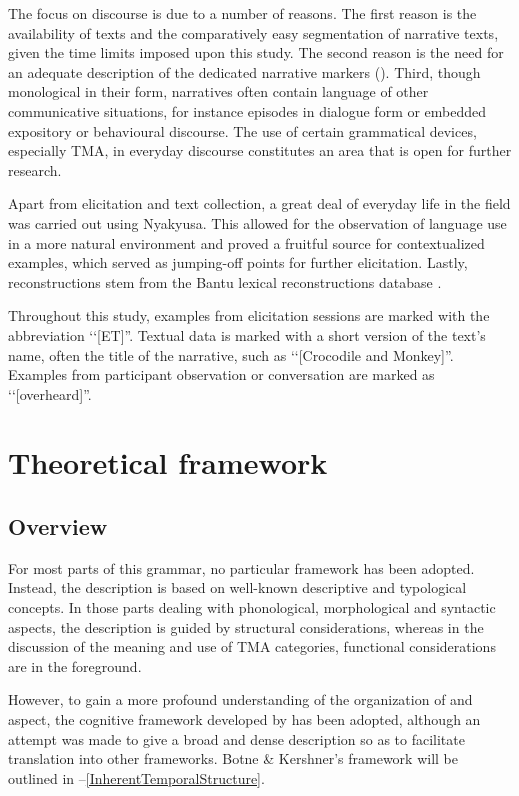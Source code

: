 The focus on  discourse is due to a number of reasons. The first reason is the availability of texts and the comparatively easy segmentation of narrative texts, given the time limits imposed upon this study. The second reason is the need for an adequate description of the dedicated narrative markers (). Third, though monological in their form, narratives often contain language of other communicative situations, for instance episodes in dialogue form or embedded expository or behavioural discourse. The use of certain grammatical devices, especially TMA, in everyday discourse constitutes an area that is open for further research.

Apart from elicitation and text collection, a great deal of everyday life in the field was carried out using Nyakyusa. This allowed for the observation of language use in a more natural environment and proved a fruitful source for contextualized examples, which served as jumping-off points for further elicitation. Lastly,  reconstructions stem from the Bantu lexical reconstructions database \citep{BLR3}.

Throughout this study, examples from elicitation sessions are marked with the abbreviation \lq\lq[ET]''. Textual data is marked with a short version of the text's name, often the title of the narrative, such as \lq\lq[Crocodile and Monkey]''. Examples from participant observation or conversation are marked as \lq\lq[overheard]''.
\section{Theoretical framework}\label{TheoreticalFramework}
\subsection{Overview}
For most parts of this grammar, no particular framework has been adopted. Instead, the description is based on well-known descriptive and typological concepts. In those parts dealing with phonological, morphological and syntactic aspects, the description is guided by structural considerations, whereas in the discussion of the meaning and use of TMA categories, functional considerations are in the foreground.

However, to gain a more profound understanding of the organization of  and aspect, the cognitive framework developed by \citet{BotneRKershnerT2008} has been adopted, although an attempt was made to give a broad and dense description so as to facilitate translation into other frameworks. Botne \& Kershner's framework will be outlined in --\ref{InherentTemporalStructure}.
 
